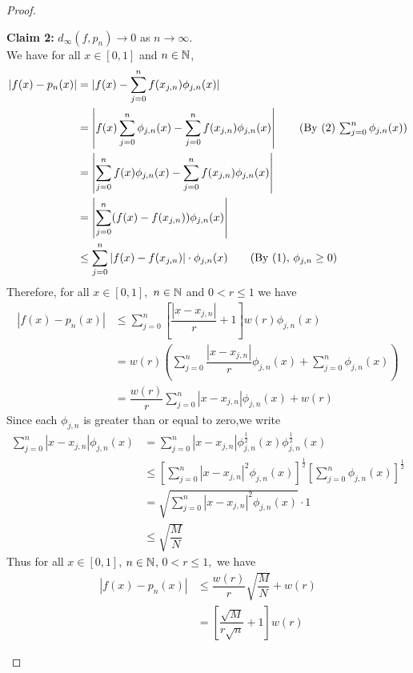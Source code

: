 \begin{proof}
\begin{description}
        \textbf{Claim 2: } $d_\infty(f,p_n) \to 0$ as $n \to \infty$.\\
        We have for all $x \in [0,1]$ and $n \in \mathbb{N}$,
        \begin{align*}
            |f(x)-p_n(x)| &= |f(x)-\sum_{j=0}^{n}f(x_{j,n})\phi_{j,n}(x)| \\
            &= \left|f(x) \sum_{j=0}^{n}\phi_{j,n}(x) - \sum_{j=0}^{n}f(x_{j,n})\phi_{j,n}(x)\right| \tag{By (2) $\sum_{j=0}^{n}\phi_{j,n}(x)$}\\
            &=\left|\sum_{j=0}^{n}f(x)\phi_{j,n}(x) - \sum_{j=0}^{n}f(x_{j,n})\phi_{j,n}(x)\right| \\
            &= \left|\sum_{j=0}^{n}(f(x)-f(x_{j,n}))\phi_{j,n}(x)\right| \\ 
            &\leq \sum_{j=0}^{n}|f(x)-f(x_{j,n})| \cdot \phi_{j,n}(x) \tag{By (1), $\phi_{j,n} \geq 0$}
        \end{align*}
        Therefore, for all $x \in [0,1],$ $n \in \mathbb{N}$ and $0 < r \leq 1$ we have 
        \begin{align*}
            |f(x) - p_n(x)| &\leq \sum_{j=0}^{n}\left[\dfrac{|x-x_{j,n}|}{r}+1\right]w(r) \phi_{j,n}(x) \\
            &= w(r) \left(\sum_{j=0}^{n}\dfrac{|x-x_{j,n}|}{r}\phi_{j,n}(x) + \sum_{j=0}^{n}\phi_{j,n}(x)\right) \\ 
            &=\dfrac{w(r)}{r}\sum_{j=0}^{n}|x-x_{j,n}|\phi_{j,n}(x) + w(r)
        \end{align*}
        Since each $\phi_{j,n}$ is greater than or equal to zero,we write
        \begin{align*}
            \sum_{j=0}^{n}|x-x_{j,n}|\phi_{j,n}(x) &= \sum_{j=0}^{n}|x-x_{j,n}|\phi^{\frac{1}{2}}_{j,n}(x)\phi^{\frac{1}{2}}_{j,n}(x) \\
            &\leq \left[\sum_{j=0}^n|x-x_{j,n}|^2 \phi_{j,n}(x)\right]^\frac{1}{2}\left[\sum_{j=0}^{n}\phi_{j,n}(x)\right]^\frac{1}{2} \tag{Cauchy-Schwarz} \\
            &= \sqrt{\sum_{j=0}^{n}|x-x_{j,n}|^2\phi_{j,n}(x)} \cdot 1 \\
            &\leq \sqrt{\dfrac{M}{N}} \tag{By (3)}
        \end{align*}
        Thus for all $x \in [0,1]$, $n \in \mathbb{N}$, $0 < r \leq 1,$ we have 
        \begin{align*}
            |f(x) - p_n(x)| &\leq \dfrac{w(r)}{r}\sqrt{\dfrac{M}{N}} + w(r) \\
            &= \left[\dfrac{\sqrt{M}}{r\sqrt{n}}+1\right]w(r)
        \end{align*}

\end{description}
\end{proof}
